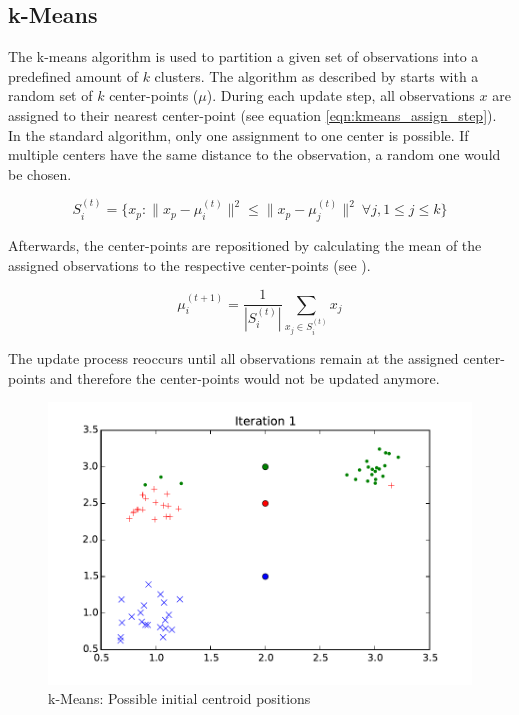 \subsection{k-Means}
\label{sec:kmeans}

The k-means algorithm is used to partition a given set of observations into a predefined amount of $k$ clusters. The algorithm as described by \cite{macqueen1967} starts with a random set of $k$ center-points ($\mu$). During each update step, all observations $x$ are assigned to their nearest center-point (see equation \ref{eqn:kmeans_assign_step}). In the standard algorithm, only one assignment to one center is possible. If multiple centers have the same distance to the observation, a random one would be chosen.

\begin{equation}
S_i^{(t)} = \big \{ x_p : \big \| x_p - \mu^{(t)}_i \big \|^2 \le \big \| x_p - \mu^{(t)}_j \big \|^2 \ \forall j, 1 \le j \le k \big\}
\label{eqn:kmeans_assign_step}
\end{equation}

Afterwards, the center-points are repositioned by calculating the mean of the assigned observations to the respective center-points (see ).

\begin{equation}
\mu^{(t+1)}_i = \frac{1}{|S^{(t)}_i|} \sum_{x_j \in S^{(t)}_i} x_j
\label{eqn:kmeans_update_step}
\end{equation}

The update process reoccurs until all observations remain at the assigned center-points and therefore the center-points would not be updated anymore.


\begin{figure}
\includegraphics[width=0.7\linewidth]{images/iteration01}
\caption{k-Means: Possible initial centroid positions}
\label{fig:kmeans:iteration01}
\end{figure}


